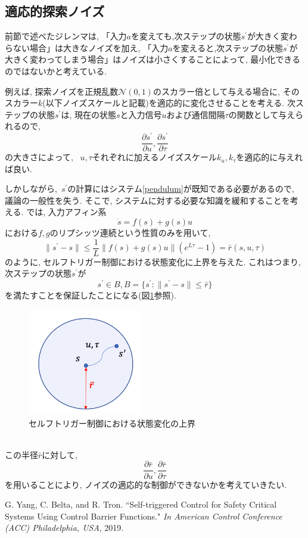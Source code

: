 \documentclass{jsarticle}
\newcommand{\pdif}[2]{\frac{\partial#1}{\partial#2}}
\begin{document}
\subsection{適応的探索ノイズ}
前節で述べたジレンマは, 「入力$a$を変えても,次ステップの状態$s^{\prime}$が大きく変わらない場合」は大きなノイズを加え, 「入力$a$を変えると,次ステップの状態$s^{\prime}$が大きく変わってしまう場合」はノイズは小さくすることによって, 最小化できるのではないかと考えている. \par
例えば, 探索ノイズを正規乱数$\mathcal{N}(0,1)$のスカラー倍として与える場合に, そのスカラー$k$(以下ノイズスケールと記載)を適応的に変化させることを考える. 次ステップの状態$s^{\prime}$は, 現在の状態$s$と入力信号$u$および通信間隔$\tau$の関数として与えられるので, 
\[\pdif{s^{\prime}}{u}, \pdif{s^{\prime}}{\tau}\]
の大きさによって, ~$u,\tau$それぞれに加えるノイズスケール$k_u, k_{\tau}$を適応的に与えれば良い. \par
しかしながら,~$s^{\prime}$の計算にはシステム\eqref{pendulum}が既知である必要があるので, 議論の一般性を失う. そこで, システムに対する必要な知識を緩和することを考える. \cite{ECBF}では, 入力アフィン系
\begin{equation}
	\dot{s} = f(s)+g(s)u
\end{equation}
における$f,g$のリプシッツ連続という性質のみを用いて,  
\begin{equation}
	\|s^{\prime}-s\|\leq \frac{1}{L}\|f(s)+g(s)u\|(e^{L\tau}-1)=\bar{r}(s,u,\tau)
\end{equation}
のように, セルフトリガー制御における状態変化に上界を与えた. これはつまり, 次ステップの状態$s^{\prime}$が
\begin{equation}
	s^{\prime} \in B, B=\{s^{\prime} :\|s^{\prime}-s\|\leq \bar{r}\}
\end{equation}
を満たすことを保証したことになる(図\ref{s_prime}参照).
\begin{figure}[h]
	\centering
 	\includegraphics[width=5cm]{s_prime}
 	\caption{セルフトリガー制御における状態変化の上界} \label{s_prime}
\end{figure}\\
この半径$\bar{r}$に対して, 
\[\pdif{\bar{r}}{u}, \pdif{\bar{r}}{\tau}\]
を用いることにより, ノイズの適応的な制御ができないかを考えていきたい.


\begin{thebibliography}{10}
G. Yang, C. Belta, and R. Tron. “Self-triggered Control for Safety Critical Systems Using Control Barrier Functions."  \textit{In American Control Conference (ACC) Philadelphia, USA}, 2019.
 
 \end{thebibliography}
\end{document}
